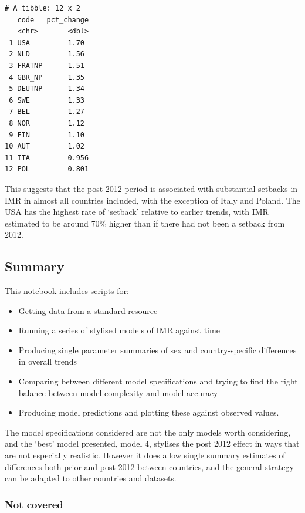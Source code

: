 \documentclass[
  letterpaper,
  DIV=11,
  numbers=noendperiod]{scrartcl}
\begin{document}
\begin{verbatim}
# A tibble: 12 x 2
   code   pct_change
   <chr>       <dbl>
 1 USA         1.70 
 2 NLD         1.56 
 3 FRATNP      1.51 
 4 GBR_NP      1.35 
 5 DEUTNP      1.34 
 6 SWE         1.33 
 7 BEL         1.27 
 8 NOR         1.12 
 9 FIN         1.10 
10 AUT         1.02 
11 ITA         0.956
12 POL         0.801
\end{verbatim}

This suggests that the post 2012 period is associated with substantial
setbacks in IMR in almost all countries included, with the exception of
Italy and Poland. The USA has the highest rate of `setback' relative to
earlier trends, with IMR estimated to be around 70\% higher than if
there had not been a setback from 2012.

\hypertarget{summary}{%
\subsection{Summary}\label{summary}}

This notebook includes scripts for:

\begin{itemize}
\item
  Getting data from a standard resource
\item
  Running a series of stylised models of IMR against time
\item
  Producing single parameter summaries of sex and country-specific
  differences in overall trends
\item
  Comparing between different model specifications and trying to find
  the right balance between model complexity and model accuracy
\item
  Producing model predictions and plotting these against observed
  values.
\end{itemize}

The model specifications considered are not the only models worth
considering, and the `best' model presented, model 4, stylises the post
2012 effect in ways that are not especially realistic. However it does
allow single summary estimates of differences both prior and post 2012
between countries, and the general strategy can be adapted to other
countries and datasets.

\hypertarget{not-covered}{%
\subsubsection{Not covered}\label{not-covered}}
\end{document}
